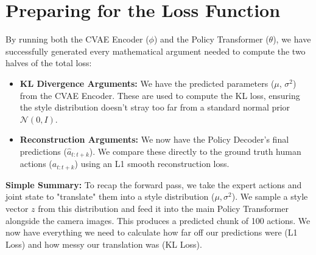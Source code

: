 \documentclass[11pt,a4paper]{article}
\begin{document}
\section{Preparing for the Loss Function}
By running both the CVAE Encoder ($\phi$) and the Policy Transformer ($\theta$), we have successfully generated every mathematical argument needed to compute the two halves of the total loss:

\begin{itemize}
    \item \textbf{KL Divergence Arguments:} We have the predicted parameters ($\mu$, $\sigma^2$) from the CVAE Encoder. These are used to compute the KL loss, ensuring the style distribution doesn't stray too far from a standard normal prior $\mathcal{N}(0, I)$.
    \item \textbf{Reconstruction Arguments:} We now have the Policy Decoder's final predictions ($\hat{a}_{t:t+k}$). We compare these directly to the ground truth human actions ($a_{t:t+k}$) using an L1 smooth reconstruction loss.
\end{itemize}

\textbf{Simple Summary:} To recap the forward pass, we take the expert actions and joint state to "translate" them into a style distribution ($\mu, \sigma^2$). We sample a style vector $z$ from this distribution and feed it into the main Policy Transformer alongside the camera images. This produces a predicted chunk of 100 actions. We now have everything we need to calculate how far off our predictions were (L1 Loss) and how messy our translation was (KL Loss).
\end{document}
